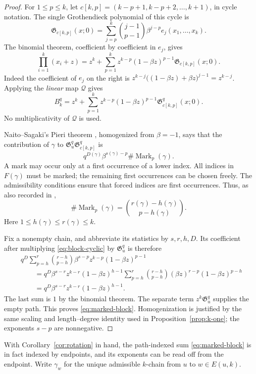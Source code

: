 \documentclass[11pt]{article}
\newcommand{\G}{\mathfrak{G}}
\newcommand{\Q}{\mathcal{Q}}
\begin{document}
\begin{proof}
For $1\leq p\leq k$, let
$c[k,p]=(k-p+1,k-p+2,\ldots,k+1)$, in cycle notation.
The single Grothendieck polynomial of this cycle is
\[
 \G_{c[k,p]}(x;0)
   =\sum_{j=p}^k
       \binom{j-1}{p-1}\beta^{j-p}e_j(x_1,\ldots,x_k).
\]
The binomial theorem, coefficient by coefficient in $e_j$, gives
\[
 \prod_{i=1}^k(x_i+z)
  =z^k+\sum_{p=1}^k
       z^{k-p}(1-\beta z)^{p-1}\G_{c[k,p]}(x;0).
\]
Indeed the coefficient of $e_j$ on the right is
$z^{k-j}\bigl((1-\beta z)+\beta z\bigr)^{j-1}=z^{k-j}$.
Applying the \emph{linear} map $\Q$ gives
\begin{equation}\label{eq:block-cyclic}
 B_k^q=z^k+\sum_{p=1}^k
       z^{k-p}(1-\beta z)^{p-1}\G_{c[k,p]}^q(x;0).
\end{equation}
No multiplicativity of $\Q$ is used.

Naito--Sagaki's Pieri theorem \cite[Theorem~2.13]{naito2024pieri},
homogenized from $\beta=-1$, says that the contribution of
$\gamma$ to
$\G_u^q\G_{c[k,p]}^q$ is
\[
 q^{D(\gamma)}\beta^{s(\gamma)-p}
       \#\operatorname{Mark}_p(\gamma).
\]
A mark may occur only at a first occurrence of a lower index.
All indices in $F(\gamma)$ must be marked; the remaining first
occurrences can be chosen freely. The admissibility conditions
ensure that forced indices are first occurrences.
Thus, as also recorded in \cite[Remark~2.14]{naito2024pieri},
\[
 \#\operatorname{Mark}_p(\gamma)
       =\binom{r(\gamma)-h(\gamma)}{p-h(\gamma)}.
\]
Here $1\leq h(\gamma)\leq r(\gamma)\leq k$.

Fix a nonempty chain, and abbreviate its statistics by $s,r,h,D$.
Its coefficient after multiplying \eqref{eq:block-cyclic} by
$\G_u^q$ is therefore
\begin{align*}
 &q^D\sum_{p=h}^r
       \binom{r-h}{p-h}
       \beta^{s-p}z^{k-p}(1-\beta z)^{p-1}\\
 &\qquad=
 q^D\beta^{s-r}z^{k-r}(1-\beta z)^{h-1}
 \sum_{p=h}^r\binom{r-h}{p-h}
       (\beta z)^{r-p}(1-\beta z)^{p-h}\\
 &\qquad=
 q^D\beta^{s-r}z^{k-r}(1-\beta z)^{h-1}.
\end{align*}
The last sum is $1$ by the binomial theorem.
The separate term $z^k\G_u^q$ supplies the empty path.
This proves \eqref{eq:marked-block}.
Homogenization is justified by the same scaling and
length--degree identity used in Proposition~\ref{prop:k-one};
the exponents $s-p$ are nonnegative.
\end{proof}

With Corollary~\ref{cor:rotation} in hand, the path-indexed sum
\eqref{eq:marked-block} is in fact indexed by endpoints, and its
exponents can be read off from the endpoint. Write $\gamma_w$ for the
unique admissible $k$-chain from $u$ to $w\in E(u,k)$.
\end{document}
